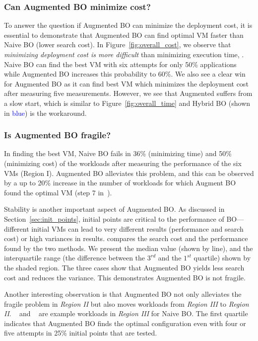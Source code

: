 \subsubsection*{Can Augmented BO minimize cost?}

To answer the question if Augmented BO can minimize the deployment cost, it is essential to demonstrate that Augmented BO can find optimal VM faster than Naive BO (lower search cost). In Figure~\ref{fig:overall_cost}, we observe that \textit{minimizing deployment cost is more difficult} than minimizing execution time, .
Naive BO can find the best VM with six attempts
for only 50\% applications while Augmented BO increases this probability to 60\%. We also see a clear win for Augmented BO as it can find best VM which minimizes the deployment cost after measuring five measurements. However, we see that Augmented suffers from a slow start, which is similar to Figure~\ref{fig:overall_time} and  Hybrid BO (shown in \textcolor{blue}{blue}) is the workaround. 


\subsubsection*{Is Augmented BO fragile?}

In finding the best VM, Naive BO fails
in 36\% (minimizing time) and 50\% (minimizing cost) of the workloads
after measuring the performance of the six VMs (Region I).
Augmented BO alleviates this problem, and this can be observed by a
up to 20\% increase in the number of workloads for which Augment BO found the optimal VM (step 7 in~\myfigure{\ref{fig:overall_cost}}).

Stability is another important aspect of Augmented BO. As discussed in Section~\ref{sec:init_points},
initial points are critical to the performance of BO---different initial VMs can lead to very different results (performance and search cost) or high variances in results. \myfigure{\ref{fig:convergence_time}} compares the search cost and the performance found by the two methods. We present the median value (shown by line), and the interquartile range (the difference between the $3^{rd}$ and the $1^{st}$ quartile) shown by the shaded region. The three cases show that Augmented BO yields less search cost and reduces the variance. This demonstrates  Augmented BO is not fragile.

Another interesting observation is that
Augmented BO not only alleviates the fragile problem in \emph{Region II} but also
moves workloads from \emph{Region III} to \emph{Region II}.
~\myfigure{\ref{fig:convergence_time_1}} and
~\myfigure{\ref{fig:convergence_time_2}} are example workloads
in \emph{Region III} for Naive BO.
The first quartile indicates that Augmented BO finds the optimal configuration
even with four or five attempts in 25\% initial points that are tested.




